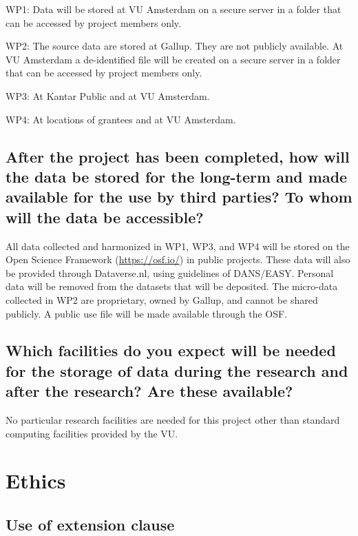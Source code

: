 \documentclass[twocolumn, serif, rga, numeric]{jote-article}
\begin{document}
WP1: Data will be stored at VU Amsterdam on a secure server in a folder that can be accessed by project members only.

WP2: The source data are stored at Gallup. They are not publicly available. At VU Amsterdam a de-identified file will be created on a secure server in a folder that can be accessed by project members only.

WP3: At Kantar Public and at VU Amsterdam.

WP4: At locations of grantees and at VU Amsterdam.

\subsection{After the project has been completed, how will the data be stored for the long-term and made available for the use by third parties? To whom will the data be accessible?}

All data collected and harmonized in WP1, WP3, and WP4 will be stored on the Open Science Framework (\url{https://osf.io/}) in public projects.
These data will also be provided through Dataverse.nl, using guidelines of DANS/EASY. Personal data will be removed from the datasets that will be deposited. The micro-data collected in WP2 are proprietary, owned by Gallup, and cannot be shared publicly. A public use file will be made available through the OSF.

 {}\subsection*{Which facilities do you expect will be needed for the storage of data during the research and after the research? Are these available?} 

No particular research facilities are needed for this project other than standard computing facilities provided by the VU.

 {}\section*{Ethics} 

 {}\subsection*{Use of extension clause} 
\end{document}
